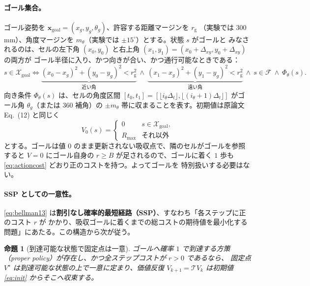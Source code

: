 \documentclass[11pt]{ltjsarticle}
\newtheorem{proposition}{命題}
\newcommand{\Rmax}{R_{\max}}        %
\newcommand{\Xgoal}{\mathcal{X}_{\mathrm{goal}}}
\begin{document}
\paragraph{ゴール集合。}
ゴール姿勢を $\mathbf{x}_{\mathrm{goal}}=(x_g,y_g,\theta_g)$、許容する距離マージンを $r_{\mathrm g}$
（実験では $300$ mm）、角度マージンを $m_\theta$（実験では $\pm15^\circ$）とする。状態 $s$ がゴールと
みなされるのは、セルの左下角 $(x_0,y_0)$ と右上角 $(x_1,y_1)=(x_0+\Delta_{xy},y_0+\Delta_{xy})$ の両方が
ゴール半径に入り、かつ向きが合い、かつ通行可能なときである：
\begin{equation}
s\in\Xgoal\iff
\underbrace{(x_0-x_g)^2+(y_0-y_g)^2<r_{\mathrm g}^2}_{\text{近い角}}\ \wedge\
\underbrace{(x_1-x_g)^2+(y_1-y_g)^2<r_{\mathrm g}^2}_{\text{遠い角}}\ \wedge\
s\in\mathcal{F}\ \wedge\ \Phi_\theta(s).
\label{eq:goal}
\end{equation}
向き条件 $\Phi_\theta(s)$ は、セルの角度区間
$[t_0,t_1]=[\lfloor i_\theta\Delta_t\rfloor,\lfloor(i_\theta{+}1)\Delta_t\rfloor]$ がゴール角
$\theta_g$（または $360$ 補角）の $\pm m_\theta$ 帯に収まることを表す。初期値は原論文 Eq.~(12)
と同じく
\begin{equation}
V_0(s)=
\begin{cases}
0 & s\in\Xgoal,\\
\Rmax & \text{それ以外}
\end{cases}
\label{eq:init}
\end{equation}
とする。ゴールは値 $0$ のまま更新されない吸収点で、隣のセルがゴールを参照すると $V=0$ にゴール自身の
$r\ge B$ が足されるので、ゴールに着く $1$ 歩も \eqref{eq:actioncost} どおり正のコストを持つ。よってゴールを
特別扱いする必要はない。

\paragraph{SSP としての一意性。}
\eqref{eq:bellman13} は\textbf{割引なし確率的最短経路（SSP）}、すなわち「各ステップに正のコスト $r$ が
かかり、吸収ゴールに着くまでの総コストの期待値を最小化する問題」にあたる。この構造から次が従う。

\begin{proposition}[到達可能な状態で固定点は一意]
\label{prop:unique}
ゴールへ確率 $1$ で到達する方策（proper policy）が存在し、かつ全ステップコストが $r>0$ であるなら、
固定点 $V^\star$ は\emph{到達可能な状態の上で一意}に定まり、価値反復 $V_{k+1}=\mathcal{T}V_k$ は初期値
\eqref{eq:init} からそこへ収束する。
\end{proposition}
\end{document}
